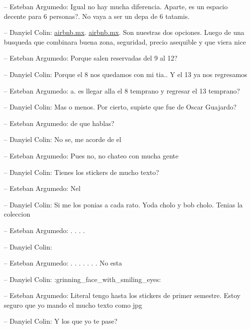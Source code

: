 -- Esteban Argumedo: Igual no hay mucha diferencia. Aparte, es un
espacio decente para 6 personas?. No vaya a ser un depa de 6 tatamis.

-- Danyiel Colin:
\href{https://www.airbnb.mx/rooms/548690313271447643?check_out=2022-04-12\&adults=5\&check_in=2022-04-09\&s=13\&unique_share_id=7404C741-4859-4170-9253-FC1543B8105B\&_branch_match_id=1022156176184315161\&_branch_referrer=H4sIAAAAAAAAA8soKSkottLXT0zKS9LLTdXP9SvIz\%2FDLcnXLSwIA3Xm6sBsAAAA\%3D\&source_impression_id=p3_1644950262_Ld3OW52Auh4FbOhk}{airbnb.mx}.
\href{https://www.airbnb.mx/rooms/45138632?check_out=2022-04-12\&adults=5\&check_in=2022-04-09\&s=13\&unique_share_id=48DF2FE2-6EC9-4ABE-A901-E9721D8B4027\&_branch_match_id=1022156176184315161\&_branch_referrer=H4sIAAAAAAAAA8soKSkottLXT0zKS9LLTdXP8Q0rK3dycXXLSwIADnG5kBsAAAA\%3D\&source_impression_id=p3_1644950251_ZAoG2GruZsFDB0RG}{airbnb.mx}.
Son nuestras dos opciones. Luego de una busqueda que combinara buena
zona, seguridad, precio asequible y que viera nice

-- Esteban Argumedo: Porque salen reservadas del 9 al 12?

-- Danyiel Colin: Porque el 8 nos quedamos con mi tia.. Y el 13 ya nos
regresamos

-- Esteban Argumedo: a. es llegar alla el 8 temprano y regresar el 13
temprano?

-- Danyiel Colin: Mas o menos. Por cierto, supiste que fue de Oscar
Guajardo?

-- Esteban Argumedo: de que hablas?

-- Danyiel Colin: No se, me acorde de el

-- Esteban Argumedo: Pues no, no chateo con mucha gente

-- Danyiel Colin: Tienes los stickers de mucho texto?

-- Esteban Argumedo: Nel

-- Danyiel Colin: Si me los ponias a cada rato. Yoda cholo y bob cholo.
Tenias la coleccion

-- Esteban Argumedo: . . . .

-- Danyiel Colin:

-- Esteban Argumedo: . . . . . . . No esta

-- Danyiel Colin: :grinning\_face\_with\_smiling\_eyes:

-- Esteban Argumedo: Literal tengo hasta los stickers de primer
semestre. Estoy seguro que yo mando el mucho texto como jpg

-- Danyiel Colin: Y los que yo te pase?

